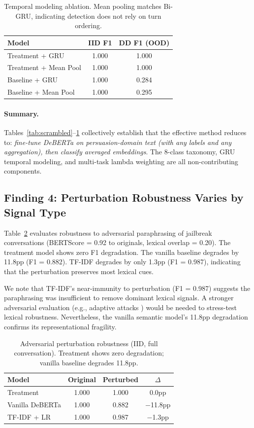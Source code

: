 \documentclass[11pt]{article}
\begin{document}
\begin{table}[t]
\centering
\caption{Temporal modeling ablation. Mean pooling matches Bi-GRU, indicating detection does not rely on turn ordering.}
\label{tab:temporal}
\begin{tabular}{lcc}
\toprule
\textbf{Model} & \textbf{IID F1} & \textbf{DD F1 (OOD)} \\
\midrule
Treatment + GRU & 1.000 & 1.000 \\
Treatment + Mean Pool & 1.000 & 1.000 \\
Baseline + GRU & 1.000 & 0.284 \\
Baseline + Mean Pool & 1.000 & 0.295 \\
\bottomrule
\end{tabular}
\end{table}

\paragraph{Summary.}
Tables~\ref{tab:scrambled}--\ref{tab:temporal} collectively establish that the effective method reduces to: \textit{fine-tune DeBERTa on persuasion-domain text (with any labels and any aggregation), then classify averaged embeddings}. The 8-class taxonomy, GRU temporal modeling, and multi-task lambda weighting are all non-contributing components.

\subsection{Finding 4: Perturbation Robustness Varies by Signal Type}

Table~\ref{tab:perturbation} evaluates robustness to adversarial paraphrasing of jailbreak conversations (BERTScore = 0.92 to originals, lexical overlap = 0.20). The treatment model shows zero F1 degradation. The vanilla baseline degrades by 11.8pp (F1 = 0.882). TF-IDF degrades by only 1.3pp (F1 = 0.987), indicating that the perturbation preserves most lexical cues.

We note that TF-IDF's near-immunity to perturbation (F1 = 0.987) suggests the paraphrasing was insufficient to remove dominant lexical signals. A stronger adversarial evaluation (e.g., adaptive attacks \citep{nasr2025adaptive}) would be needed to stress-test lexical robustness. Nevertheless, the vanilla semantic model's 11.8pp degradation confirms its representational fragility.

\begin{table}[t]
\centering
\caption{Adversarial perturbation robustness (IID, full conversation). Treatment shows zero degradation; vanilla baseline degrades 11.8pp.}
\label{tab:perturbation}
\begin{tabular}{lccc}
\toprule
\textbf{Model} & \textbf{Original} & \textbf{Perturbed} & \textbf{$\Delta$} \\
\midrule
Treatment & 1.000 & 1.000 & 0.0pp \\
Vanilla DeBERTa & 1.000 & 0.882 & $-$11.8pp \\
TF-IDF + LR & 1.000 & 0.987 & $-$1.3pp \\
\bottomrule
\end{tabular}
\end{table}
\end{document}
